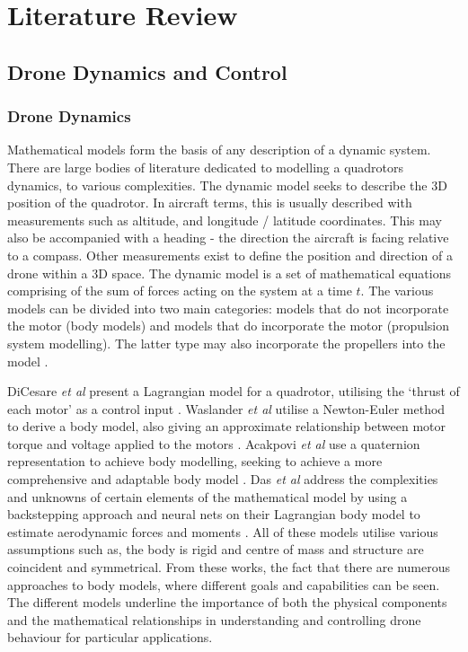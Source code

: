 \chapter{Literature Review}
\section{Drone Dynamics and Control}
\subsection{Drone Dynamics}
Mathematical models form the basis of any description of a dynamic system. There are large bodies of literature dedicated to modelling a quadrotors dynamics, to various complexities. The dynamic model seeks to describe the 3D position of the quadrotor. In aircraft terms, this is usually described with measurements such as altitude, and longitude / latitude coordinates. This may also be accompanied with a heading - the direction the aircraft is facing relative to a compass. Other measurements exist to define the position and direction of a drone within a 3D space. The dynamic model is a set of mathematical equations comprising of the sum of forces acting on the system at a time $t$. The various models can be divided into two main categories: models that do not incorporate the motor (body models) and models that do incorporate the motor (propulsion system modelling). The latter type may also incorporate the propellers into the model \cite{hd1}.

DiCesare \textit{et al} present a Lagrangian model for a quadrotor, utilising the `thrust of each motor' as a control input \cite{hd2}. Waslander \textit{et al} utilise a Newton-Euler method to derive a body model, also giving an approximate relationship between motor torque and voltage applied to the motors \cite{hd3}. Acakpovi \textit{et al} use a quaternion representation to achieve body modelling, seeking to achieve a more comprehensive and adaptable body model \cite{hd4}. Das \textit{et al} address the complexities and unknowns of certain elements of the mathematical model by using a backstepping approach and neural nets on their Lagrangian body model to estimate aerodynamic forces and moments \cite{hd5}. All of these models utilise various assumptions such as, the body is rigid and centre of mass and structure are coincident and symmetrical. From these works, the fact that there are numerous approaches to body models, where different goals and capabilities can be seen. The different models underline the importance of both the physical components and the mathematical relationships in understanding and controlling drone behaviour for particular applications.

